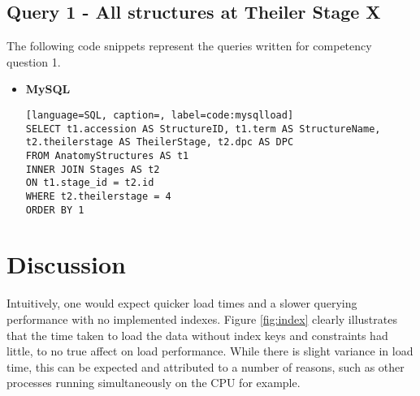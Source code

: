 \subsection*{Query 1 - All structures at Theiler Stage X}\label{query1}

The following code snippets represent the queries written for competency question 1.
\begin{itemize}
\item \textbf{MySQL}
\begin{lstlisting}[language=SQL, caption=, label=code:mysqlload]
SELECT t1.accession AS StructureID, t1.term AS StructureName, t2.theilerstage AS TheilerStage, t2.dpc AS DPC
FROM AnatomyStructures AS t1
INNER JOIN Stages AS t2
ON t1.stage_id = t2.id
WHERE t2.theilerstage = 4
ORDER BY 1
\end{lstlisting}
\end{itemize}
\parindent 15pt
\section{Discussion}\label{discussion}
Intuitively, one would expect quicker load times and a slower querying performance with no implemented indexes. Figure \ref{fig:index} clearly illustrates that the time taken to load the data without index keys and constraints had little, to no true affect on load performance. While there is slight variance in load time, this can be expected and attributed to a number of reasons, such as other processes running simultaneously on the CPU for example.